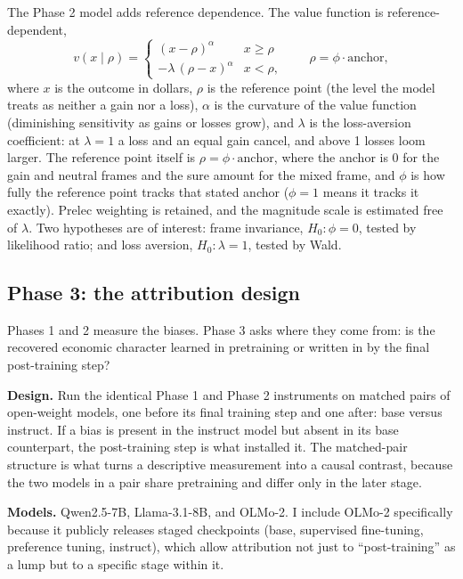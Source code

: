 \documentclass[11pt]{article}
\begin{document}
The Phase 2 model adds reference dependence. The value function is reference-dependent,
\[
  v(x \mid \rho) =
  \begin{cases}
    (x - \rho)^{\alpha} & x \ge \rho \\[2pt]
    -\lambda\,(\rho - x)^{\alpha} & x < \rho,
  \end{cases}
  \qquad \rho = \phi \cdot \text{anchor},
\]
where $x$ is the outcome in dollars, $\rho$ is the reference point (the level the model treats as neither
a gain nor a loss), $\alpha$ is the curvature of the value function (diminishing sensitivity as gains or
losses grow), and $\lambda$ is the loss-aversion coefficient: at $\lambda = 1$ a loss and an equal gain
cancel, and above 1 losses loom larger. The reference point itself is $\rho = \phi \cdot \text{anchor}$,
where the anchor is 0 for the gain and neutral frames and the sure amount for the mixed frame, and $\phi$
is how fully the reference point tracks that stated anchor ($\phi = 1$ means it tracks it exactly). Prelec
weighting is retained, and the magnitude scale is estimated free of $\lambda$. Two hypotheses are of
interest: frame invariance, $H_0: \phi = 0$, tested by likelihood ratio; and loss aversion, $H_0: \lambda
= 1$, tested by Wald.

\subsection{Phase 3: the attribution design}

Phases 1 and 2 measure the biases. Phase 3 asks where they come from: is the recovered economic character
learned in pretraining or written in by the final post-training step?

\textbf{Design.} Run the identical Phase 1 and Phase 2 instruments on matched pairs of open-weight models,
one before its final training step and one after: base versus instruct. If a bias is present in the
instruct model but absent in its base counterpart, the post-training step is what installed it. The
matched-pair structure is what turns a descriptive measurement into a causal contrast, because the two
models in a pair share pretraining and differ only in the later stage.

\textbf{Models.} Qwen2.5-7B, Llama-3.1-8B, and OLMo-2. I include OLMo-2 specifically because it publicly
releases staged checkpoints (base, supervised fine-tuning, preference tuning, instruct), which allow
attribution not just to ``post-training'' as a lump but to a specific stage within it.
\end{document}

